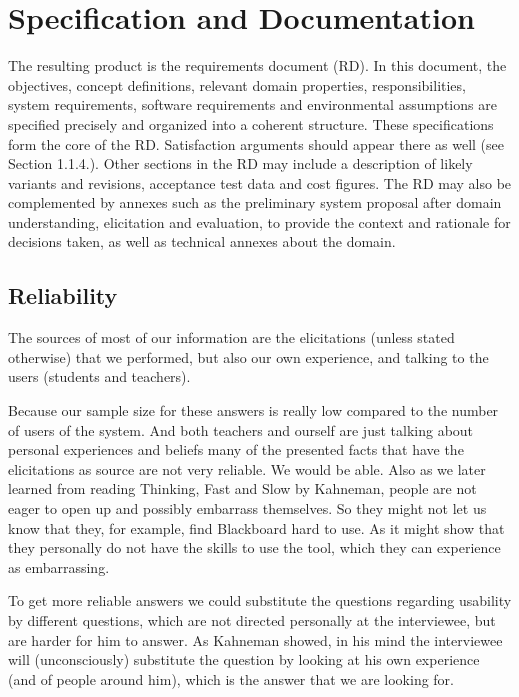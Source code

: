\chapter{Specification and Documentation}
The resulting product is the requirements document (RD). In this document, the objectives,
concept definitions, relevant domain properties, responsibilities, system requirements, software
requirements and environmental assumptions are specified precisely and organized into a
coherent structure. These specifications form the core of the RD. Satisfaction arguments should
appear there as well (see Section 1.1.4.). Other sections in the RD may include a description
of likely variants and revisions, acceptance test data and cost figures. The RD may also be
complemented by annexes such as the preliminary system proposal after domain understanding,
elicitation and evaluation, to provide the context and rationale for decisions taken, as well as
technical annexes about the domain. 

\section{Reliability}
The sources of most of our information are the elicitations (unless stated otherwise) that we performed, but also our own experience, and talking to the users (students and teachers).

Because our sample size for these answers is really low compared to the number of users of the system. And both teachers and ourself are just talking about personal experiences and beliefs many of the presented facts that have the elicitations as source are not very reliable. We would be able.
Also as we later learned from reading Thinking, Fast and Slow by Kahneman, people are not eager to open up and possibly embarrass themselves. So they might not let us know that they, for example, find Blackboard hard to use. As it might show that they personally do not have the skills to use the tool, which they can experience as embarrassing.

To get more reliable answers we could substitute the questions regarding usability by different questions, which are not directed personally at the interviewee, but are harder for him to answer. As Kahneman showed, in his mind the interviewee will (unconsciously) substitute the question by looking at his own experience (and of people around him), which is the answer that we are looking for.


